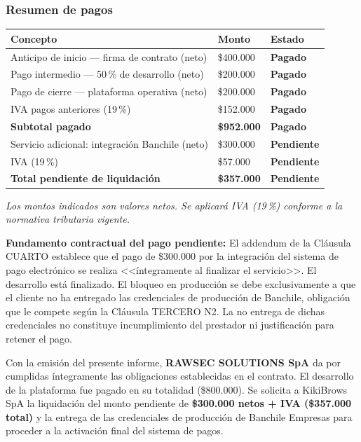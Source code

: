 \documentclass[a4paper,11pt]{article}
\newcommand{\pagado}{\textcolor{checkgreen}{\textbf{Pagado}}}
\newcommand{\pendiente}{\textcolor{warnorange}{\textbf{Pendiente}}}
\begin{document}
\subsubsection{Resumen de pagos}

\renewcommand{\arraystretch}{1.3}
\begin{longtable}{L{8.5cm} C{2.5cm} L{3.5cm}}
\toprule
\textbf{Concepto} & \textbf{Monto} & \textbf{Estado} \\
\midrule
\endhead
\bottomrule
\endfoot
Anticipo de inicio --- firma de contrato (neto)      & \$400.000 & \pagado \\
Pago intermedio --- 50\,\% de desarrollo (neto)      & \$200.000 & \pagado \\
Pago de cierre --- plataforma operativa (neto)       & \$200.000 & \pagado \\
IVA pagos anteriores (19\,\%)                        & \$152.000 & \pagado \\
\midrule
\textbf{Subtotal pagado}                             & \textbf{\$952.000} & \pagado \\
\midrule
Servicio adicional: integraci\'on Banchile (neto)    & \$300.000 & \pendiente \\
IVA (19\,\%)                                         & \$57.000  & \pendiente \\
\midrule
\textbf{Total pendiente de liquidaci\'on}            & \textbf{\$357.000} & \pendiente \\
\end{longtable}

{\small\color{midgray}\textit{Los montos indicados son valores netos. Se aplicar\'a IVA (19\,\%) conforme a la normativa tributaria vigente.}}

\begin{warnbox}
\textbf{Fundamento contractual del pago pendiente:} El addendum de la Cl\'ausula CUARTO
establece que el pago de \$300.000 por la integraci\'on del sistema de pago electr\'onico
se realiza <<\'integramente al finalizar el servicio>>. El desarrollo est\'a finalizado.
El bloqueo en producci\'on se debe exclusivamente a que el cliente no ha entregado las
credenciales de producci\'on de Banchile, obligaci\'on que le compete seg\'un la
Cl\'ausula TERCERO N\textdegree{}2. La no entrega de dichas credenciales no constituye
incumplimiento del prestador ni justificaci\'on para retener el pago.
\end{warnbox}

\medskip
Con la emisi\'on del presente informe, \textbf{RAWSEC SOLUTIONS SpA} da por cumplidas
\'integramente las obligaciones establecidas en el contrato. El desarrollo de la
plataforma fue pagado en su totalidad (\$800.000). Se solicita a KikiBrows SpA la
liquidaci\'on del monto pendiente de \textbf{\$300.000 netos + IVA (\$357.000 total)}
y la entrega de las credenciales de producci\'on de Banchile Empresas para proceder
a la activaci\'on final del sistema
de pagos.
\end{document}
